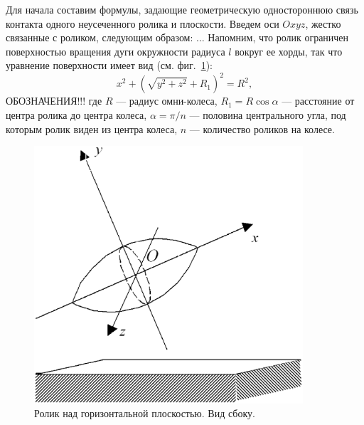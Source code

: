 
\label{sec3}
Для начала составим формулы, задающие геометрическую одностороннюю связь контакта одного неусеченного ролика и плоскости. Введем оси $Oxyz$, жестко связанные с роликом, следующим образом: ...
Напомним, что ролик ограничен поверхностью вращения дуги окружности радиуса $l$ вокруг ее хорды, так что  уравнение поверхности имеет вид (см. фиг.~\ref{Roller}):
\begin{equation}
x^2+\left(\sqrt{y^2+z^2}+R_1\right)^2=R^2,
\label{3_1}
\end{equation}
ОБОЗНАЧЕНИЯ!!!
где $R$ --- радиус омни-колеса, $R_1=R\cos{\alpha }$ --- расстояние от центра
ролика до центра колеса, $\alpha =\pi /n$ --- половина центрального угла, под
которым ролик виден из центра колеса, $n$ --- количество роликов на колесе.

\begin{figure}[htb]
\centering\includegraphics[width=10cm]{content/parts/3_friction/nd/Roller.eps}
\caption{Ролик над горизонтальной плоскостью. Вид сбоку.}
\label{Roller}
\end{figure}

\cite{Kosenko2007}\cite{Kosenko2006}


